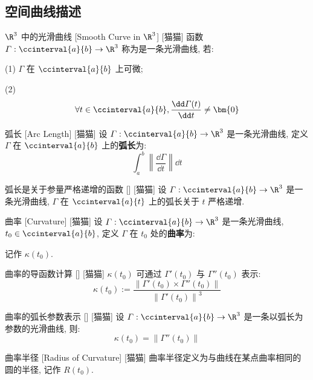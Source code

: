 \documentclass[UTF8]{ctexart}
\begin{document}
		\subsection{空间曲线描述}
			
			\begin{dfn}
				[]
				{\(\R^3\) 中的光滑曲线}
				[Smooth Curve in \(\R^3\)]
				[猫猫]
				函数 \(\varGamma:\ccinterval{a}{b}\to\R^3\) 称为是一条光滑曲线, 若: 

				(1) \(\varGamma\) 在 \(\ccinterval{a}{b}\) 上可微; 

				(2) \[\forall t\in\ccinterval{a}{b}, \frac{\dd\varGamma(t)}{\dd t}\neq\bm{0}\]
			\end{dfn}
			
			\begin{dfn}
				[]
				{弧长}
				[Arc Length]
				[猫猫]
				设 \(\varGamma:\ccinterval{a}{b}\to\R^3\) 是一条光滑曲线, 定义 \(\varGamma\) 在 \(\ccinterval{a}{b}\) 上的\textbf{弧长}为: 
				\[\int_a^b\left\|\frac{\dd\varGamma}{\dd t}\right\|\dd t\]
			\end{dfn}
			
			\begin{ppt}
				[]
				{弧长是关于参量严格递增的函数}
				[]
				[猫猫]
				设 \(\varGamma:\ccinterval{a}{b}\to\R^3\) 是一条光滑曲线, \(\varGamma\) 在 \(\ccinterval{a}{t}\) 上的弧长关于 \(t\) 严格递增. 
			\end{ppt}
			
			\begin{dfn}
				[]
				{曲率}
				[Curvature]
				[猫猫]
				设 \(\varGamma:\ccinterval{a}{b}\to\R^3\) 是一条光滑曲线, \(t_0\in\ccinterval{a}{b}\), 定义 \(\varGamma\) 在 \(t_0\) 处的\textbf{曲率}为: 

				记作 \(\kappa(t_0)\). 
			\end{dfn}
			
			\begin{ppt}
				[]
				{曲率的导函数计算}
				[]
				[猫猫]
				\(\kappa(t_0)\) 可通过 \(\varGamma'(t_0)\) 与 \(\varGamma''(t_0)\) 表示: 
				\[\kappa(t_0):=\frac{\|\varGamma'(t_0)\times\varGamma''(t_0)\|}{{\|\varGamma'(t_0)\|}^3}\]
			\end{ppt}
			
			\begin{ppt}
				[]
				{曲率的弧长参数表示}
				[]
				[猫猫]
				设 \(\varGamma:\ccinterval{a}{b}\to\R^3\) 是一条以弧长为参数的光滑曲线, 则: 
				\[\kappa(t_0)=\|\varGamma''(t_0)\|\]
			\end{ppt}
			
			\begin{dfn}
				[]
				{曲率半径}
				[Radius of Curvature]
				[猫猫]
				曲率半径定义为与曲线在某点曲率相同的圆的半径, 记作 \(R(t_0)\). 
			\end{dfn}
			
\end{document}
